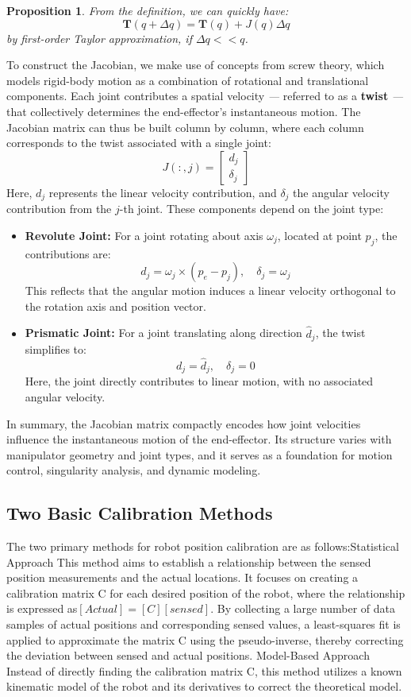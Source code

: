 \documentclass[conference]{IEEEtran}
\newtheorem{proposition}{Proposition}  %
\begin{document}
\begin{proposition}
	From the definition, we can quickly have:
	\[
		\bm{T}(q + \Delta q) = \bm{T}(q) + J(q) \Delta q
	\]
	by first-order Taylor approximation, if $\Delta q << q$. 
\end{proposition}

To construct the Jacobian, we make use of concepts from screw theory, which models rigid-body motion as a combination of rotational and translational components. Each joint contributes a spatial velocity \emph{---} referred to as a \textbf{twist} \emph{---} that collectively determines the end-effector’s instantaneous motion. The Jacobian matrix can thus be built column by column, where each column corresponds to the twist associated with a single joint:
\[
J(:, j) = 
\begin{bmatrix}
	d_j \\
	\delta_j
\end{bmatrix}
\]
Here, \(d_j\) represents the linear velocity contribution, and \(\delta_j\) the angular velocity contribution from the \(j\)-th joint. These components depend on the joint type:

\begin{itemize}
	\item \textbf{Revolute Joint:} For a joint rotating about axis \(\omega_j\), located at point \(p_j\), the contributions are:
	\[
	d_j = \omega_j \times (p_e - p_j), \quad \delta_j = \omega_j
	\]
	This reflects that the angular motion induces a linear velocity orthogonal to the rotation axis and position vector.
	
	\item \textbf{Prismatic Joint:} For a joint translating along direction \(\hat{d}_j\), the twist simplifies to:
	\[
	d_j = \hat{d}_j, \quad \delta_j = 0
	\]
	Here, the joint directly contributes to linear motion, with no associated angular velocity.
\end{itemize}

In summary, the Jacobian matrix compactly encodes how joint velocities influence the instantaneous motion of the end-effector. Its structure varies with manipulator geometry and joint types, and it serves as a foundation for motion control, singularity analysis, and dynamic modeling.

\subsection{Two Basic Calibration Methods}The two primary methods for robot position calibration are as follows:Statistical Approach
This method aims to establish a relationship between the sensed position measurements and the actual locations. It focuses on creating a calibration matrix C for each desired position of the robot, where the relationship is expressed as\([Actual] = [C][sensed]\).
By collecting a large number of data samples of actual positions and corresponding sensed values, a least-squares fit is applied to approximate the matrix C using the pseudo-inverse, thereby correcting the deviation between sensed and actual positions. Model-Based Approach
Instead of directly finding the calibration matrix C, this method utilizes a known kinematic model of the robot and its derivatives to correct the theoretical model.
\end{document}
